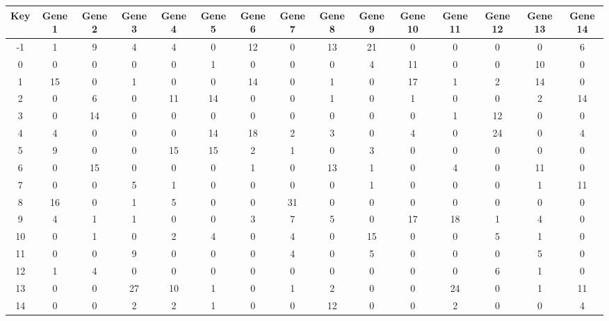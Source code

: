\begin{tabular}{|c|c|c|c|c|c|c|c|c|c|c|c|c|c|c|}
\hline
Key & Gene 1 & Gene 2 & Gene 3 & Gene 4 & Gene 5 & Gene 6 & Gene 7 & Gene 8 & Gene 9 & Gene 10 & Gene 11 & Gene 12 & Gene 13 & Gene 14 \\
\hline
-1 & 1 & 9 & 4 & 4 & 0 & 12 & 0 & 13 & 21 & 0 & 0 & 0 & 0 & 6 \\
0 & 0 & 0 & 0 & 0 & 1 & 0 & 0 & 0 & 4 & 11 & 0 & 0 & 10 & 0 \\
1 & 15 & 0 & 1 & 0 & 0 & 14 & 0 & 1 & 0 & 17 & 1 & 2 & 14 & 0 \\
2 & 0 & 6 & 0 & 11 & 14 & 0 & 0 & 1 & 0 & 1 & 0 & 0 & 2 & 14 \\
3 & 0 & 14 & 0 & 0 & 0 & 0 & 0 & 0 & 0 & 0 & 1 & 12 & 0 & 0 \\
4 & 4 & 0 & 0 & 0 & 14 & 18 & 2 & 3 & 0 & 4 & 0 & 24 & 0 & 4 \\
5 & 9 & 0 & 0 & 15 & 15 & 2 & 1 & 0 & 3 & 0 & 0 & 0 & 0 & 0 \\
6 & 0 & 15 & 0 & 0 & 0 & 1 & 0 & 13 & 1 & 0 & 4 & 0 & 11 & 0 \\
7 & 0 & 0 & 5 & 1 & 0 & 0 & 0 & 0 & 1 & 0 & 0 & 0 & 1 & 11 \\
8 & 16 & 0 & 1 & 5 & 0 & 0 & 31 & 0 & 0 & 0 & 0 & 0 & 0 & 0 \\
9 & 4 & 1 & 1 & 0 & 0 & 3 & 7 & 5 & 0 & 17 & 18 & 1 & 4 & 0 \\
10 & 0 & 1 & 0 & 2 & 4 & 0 & 4 & 0 & 15 & 0 & 0 & 5 & 1 & 0 \\
11 & 0 & 0 & 9 & 0 & 0 & 0 & 4 & 0 & 5 & 0 & 0 & 0 & 5 & 0 \\
12 & 1 & 4 & 0 & 0 & 0 & 0 & 0 & 0 & 0 & 0 & 0 & 6 & 1 & 0 \\
13 & 0 & 0 & 27 & 10 & 1 & 0 & 1 & 2 & 0 & 0 & 24 & 0 & 1 & 11 \\
14 & 0 & 0 & 2 & 2 & 1 & 0 & 0 & 12 & 0 & 0 & 2 & 0 & 0 & 4 \\
\hline
\end{tabular}